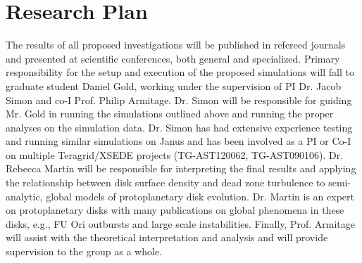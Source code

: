 \documentclass[preprint]{aastex}
\begin{document}
\section{Research Plan}
\vspace{-2mm}
The results of all proposed investigations will be published in refereed journals and presented at scientific conferences, both general and specialized.
Primary responsibility for the setup and execution of the proposed simulations will fall to graduate student Daniel Gold, working under the supervision of PI Dr. Jacob Simon and co-I Prof. Philip Armitage.  Dr. Simon will be responsible for guiding Mr. Gold in running the simulations outlined above and running the proper analyses on the simulation data. Dr. Simon has had extensive experience testing and running similar simulations on {\sc Janus} and has been involved as a PI or Co-I on multiple Teragrid/XSEDE projects (TG-AST120062, TG-AST090106).   Dr. Rebecca Martin will be responsible for interpreting the final results and applying the relationship between disk surface density and dead zone turbulence to semi-analytic, global models of protoplanetary disk evolution.  Dr. Martin is an expert on protoplanetary disks with many publications on global phenomena in these disks, e.g., FU Ori outbursts and large scale instabilities.
Finally, Prof. Armitage will assist with the theoretical interpretation and analysis and will provide supervision to the group as a whole. 



\end{document}

